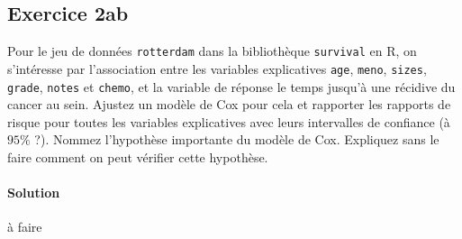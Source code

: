 \documentclass[../main.tex]{subfiles}
\begin{document}
\begin{CJK*}{UTF8}{gbsn}
\section*{Exercice 2ab}
Pour le jeu de données 
\texttt{rotterdam} dans la bibliothèque \texttt{survival} en R, 
on s'intéresse par l'association entre les variables explicatives \texttt{age}, \texttt{meno}, 
\texttt{sizes}, \texttt{grade}, \texttt{notes} et \texttt{chemo},
et la variable de réponse le temps jusqu'à une récidive du cancer au sein.
Ajustez un modèle de Cox pour cela et rapporter 
les rapports de risque pour toutes les variables explicatives avec leurs intervalles de confiance (à $95\%$ ?).
Nommez l'hypothèse importante du modèle de Cox. 
Expliquez sans le faire comment on peut vérifier cette hypothèse.

\paragraph{Solution}

à faire
\end{CJK*}
\end{document}
